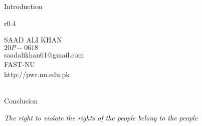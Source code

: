 \documentclass[12pt]{article}
\begin{document}
\begin{Huge}
\begin{center}
Introduction
\end{center}
\end{Huge}
\bigskip
\bigskip
\bigskip
\begin{wrapfigure}{r}{0.4\textwidth}
\end{wrapfigure}

\Large
SAAD ALI KHAN
\\

$20P-0618$
\\

saadalikhan61@gmail.com
\\

FAST-NU 
\\

http://pwr.nu.edu.pk
\\
\\

\begin{center}
\begin{huge}
Conclusion
\end{huge}
\end{center}

\begin{small}
\textit{The right to violate the rights of the people belong to the people}
\end{small}
\end{document}
